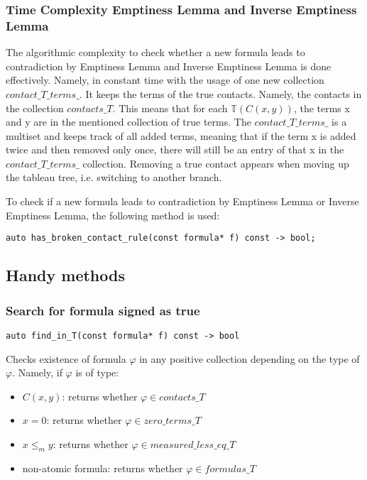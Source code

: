 \documentclass{article}
\newcommand{\signT}{\mathbb{T}}
\begin{document}
	\subsubsection*{Time Complexity Emptiness Lemma and Inverse Emptiness Lemma}
	The algorithmic complexity to check whether a new formula leads to contradiction by Emptiness Lemma and Inverse Emptiness Lemma is done effectively. Namely, in constant time with the usage of one new collection $contact\_T\_terms\_$. It keeps the terms of the true contacts. Namely, the contacts in the collection $contacts\_T$. This means that for each $\signT(C(x, y))$, the terms x and y are in the mentioned collection of true terms. The $contact\_T\_terms\_$  is a multiset and keeps track of all added terms, meaning that if the term x is added twice and then removed only once, there will still be an entry of that x in the $contact\_T\_terms\_$ collection. Removing a true contact appears when moving up the tableau tree, i.e. switching to another branch.

	To check if a new formula leads to contradiction by Emptiness Lemma or Inverse Emptiness Lemma, the following method is used:
\begin{lstlisting}
auto has_broken_contact_rule(const formula* f) const -> bool;
\end{lstlisting}

	\subsection{Handy methods}
	\subsubsection*{Search for formula signed as true}
\begin{lstlisting}
auto find_in_T(const formula* f) const -> bool
\end{lstlisting}
	Checks existence of formula $\varphi$ in any positive collection depending on the type of $\varphi$. Namely, if $\varphi$ is of type:
	\begin{itemize}
		\item $C(x, y)$: returns whether $\varphi \in contacts\_T$
		\item $x = 0$: returns whether $\varphi \in zero\_terms\_T$
		\item $x \le_m y$: returns whether $\varphi \in measured\_less\_eq\_T$
		\item non-atomic formula: returns whether $\varphi \in formulas\_T$
	\end{itemize}
\end{document}
